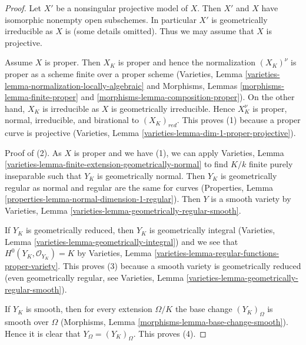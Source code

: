 \documentclass[10pt,a4paper]{amsart}
\theoremstyle{plain}
\theoremstyle{definition}
\theoremstyle{remark}
\numberwithin{equation}{subsection}
\begin{document}
\begin{proof}
Let $X'$ be a nonsingular projective model of $X$. Then $X'$ and
$X$ have isomorphic nonempty open subschemes. In particular
$X'$ is geometrically irreducible as $X$ is (some details omitted).
Thus we may assume that $X$ is projective.

\medskip\noindent
Assume $X$ is proper. Then $X_K$ is proper and hence the normalization
$(X_K)^\nu$ is proper as a scheme finite over a proper scheme
(Varieties, Lemma \ref{varieties-lemma-normalization-locally-algebraic}
and Morphisms, Lemmas \ref{morphisms-lemma-finite-proper} and
\ref{morphisms-lemma-composition-proper}).
On the other hand, $X_K$ is irreducible as $X$ is geometrically
irreducible. Hence $X_K^\nu$ is proper, normal, irreducible, and birational
to $(X_K)_{red}$. This proves (1) because a proper curve is projective
(Varieties, Lemma \ref{varieties-lemma-dim-1-proper-projective}).

\medskip\noindent
Proof of (2). As $X$ is proper and we have (1), we can apply
Varieties, Lemma \ref{varieties-lemma-finite-extension-geometrically-normal}
to find $K/k$ finite purely inseparable such that
$Y_K$ is geometrically normal. Then $Y_K$ is geometrically regular
as normal and regular are the same for curves
(Properties, Lemma \ref{properties-lemma-normal-dimension-1-regular}).
Then $Y$ is a smooth variety by
Varieties, Lemma \ref{varieties-lemma-geometrically-regular-smooth}.

\medskip\noindent
If $Y_K$ is geometrically reduced, then $Y_K$ is geometrically
integral (Varieties, Lemma \ref{varieties-lemma-geometrically-integral})
and we see that $H^0(Y_K, \mathcal{O}_{Y_K}) = K$ by
Varieties, Lemma \ref{varieties-lemma-regular-functions-proper-variety}.
This proves (3) because a smooth variety is geometrically reduced
(even geometrically regular, see
Varieties, Lemma \ref{varieties-lemma-geometrically-regular-smooth}).

\medskip\noindent
If $Y_K$ is smooth, then for every extension $\Omega/K$
the base change $(Y_K)_\Omega$ is smooth over $\Omega$
(Morphisms, Lemma \ref{morphisms-lemma-base-change-smooth}).
Hence it is clear that $Y_\Omega = (Y_K)_\Omega$. This proves (4).
\end{proof}
\end{document}
